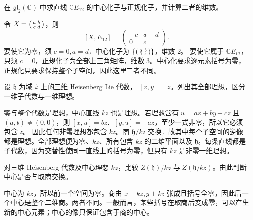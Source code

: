 \begin{exercise}\label{b5:ex:11-centralizer-normalizer}
	在 \(\mathfrak{gl}_2(\mathbb C)\) 中求直线 \(\mathbb CE_{12}\) 的中心化子与正规化子，并计算二者的维数。
\end{exercise}
\begin{solution}
	令 \(X=\begin{psmallmatrix}a&b\\c&d\end{psmallmatrix}\)，则
	\[
		[X,E_{12}]=\begin{pmatrix}-c&a-d\\0&c\end{pmatrix}.
	\]
	要使它为零，须 \(c=0,a=d\)，中心化子为
	\(\{\begin{psmallmatrix}a&b\\0&a\end{psmallmatrix}\}\)，维数 \(2\)。
	要使它属于 \(\mathbb CE_{12}\)，只须 \(c=0\)，正规化子为全部上三角矩阵，维数 \(3\)。中心化要求逐元素括号为零，正规化只要求保持整个子空间，因此这里二者不同。
\end{solution}

\begin{exercise}\label{b5:ex:11-heisenberg-ideals}
	设 \(\mathfrak h\) 为域 \(k\) 上的三维 Heisenberg Lie 代数， \([x,y]=z\)。列出其全部理想，区分一维子代数与一维理想。
\end{exercise}
\begin{solution}
	零与整个代数是理想，中心直线 \(kz\) 也是理想。若理想含有 \(u=ax+by+cz\) 且 \((a,b)\ne(0,0)\)，则 \([x,u]=bz\)、\([y,u]=-az\)，至少一式非零，所以它必须包含 \(z\)。 因此任何非零理想都包含 \(kz\)。商 \(\mathfrak h/kz\) 交换，故其中每个子空间的逆像都是理想。全部理想便为零、\(kz\)、所有包含 \(kz\) 的二维平面以及 \(\mathfrak h\)。每条直线都是子代数，因为交替性使同一直线上的括号为零，但只有 \(kz\) 是非零一维理想。
\end{solution}

\begin{exercise}\label{b5:ex:11-center-quotient-increase}
	对三维 Heisenberg 代数及中心理想 \(kz\)，比较 \(Z(\mathfrak h)/kz\) 与 \(Z(\mathfrak h/kz)\)。由此判断中心是否与取商交换。
\end{exercise}
\begin{solution}
	中心为 \(kz\)，所以前一个空间为零。商由 \(x+kz,y+kz\) 张成且括号全零，因此后一个中心是整个二维商。两者不同。一般而言，某些括号在取商后变成零，可以产生新的中心元素；中心的像只保证包含于商的中心。
\end{solution}

